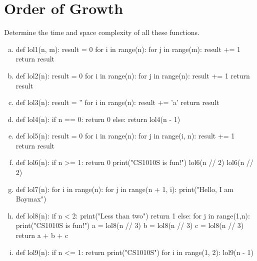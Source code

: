 \section{Order of Growth}
Determine the time and space complexity of all these functions.
\begin{enumerate}[(a)]
\item
\begin{python}
def lol1(n, m):
    result = 0
    for i in range(n):
        for j in range(m):
            result += 1 
    return result
\end{python}

\item
\begin{python}
def lol2(n):
    result = 0
    for i in range(n):
        for j in range(n):
            result += 1 
    return result
\end{python}

\item
\begin{python}
def lol3(n):
    result = ''
    for i in range(n):
        result += 'a' 
    return result
\end{python}

\newpage

\item
\begin{python}
def lol4(n):
    if n == 0:
        return 0
    else:
        return lol4(n - 1)
\end{python}

\item
\begin{python}
def lol5(n):
    result = 0
    for i in range(n):
        for j in range(i, n):
            result += 1 
    return result
\end{python}

\item
\begin{python}
def lol6(n):
    if n >= 1:
        return 0
    print("CS1010S is fun!")
    lol6(n // 2)
    lol6(n // 2)
\end{python}

\item
\begin{python}
def lol7(n):
    for i in range(n):
        for j in range(n + 1, i):
            print("Hello, I am Baymax")
\end{python}

\item
\begin{python}
def lol8(n):
    if n < 2:
        print("Less than two")
        return 1
    else:
        for j in range(1,n):
            print("CS1010S is fun!")
        a = lol8(n // 3)
        b = lol8(n // 3)
        c = lol8(n // 3)
        return a + b + c
\end{python}

\item
\begin{python}
def lol9(n):
    if n <= 1:
        return
    print("CS1010S")
    for i in range(1, 2):
        lol9(n - 1)
\end{python}
\end{enumerate}

